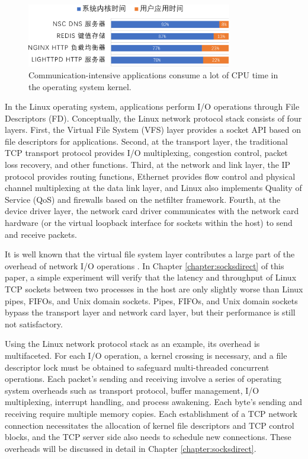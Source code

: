 \begin{figure}[htbp]
	\centering
	\includegraphics[width=0.8\textwidth]{figures/kernel_time.pdf}
	\caption{Communication-intensive applications consume a lot of CPU time in the operating system kernel.}
	\label{background:fig:kernel_time}
\end{figure}

In the Linux operating system, applications perform I/O operations through File Descriptors (FD). Conceptually, the Linux network protocol stack consists of four layers. First, the Virtual File System (VFS) layer provides a socket API based on file descriptors for applications. Second, at the transport layer, the traditional TCP transport protocol provides I/O multiplexing, congestion control, packet loss recovery, and other functions. Third, at the network and link layer, the IP protocol provides routing functions, Ethernet provides flow control and physical channel multiplexing at the data link layer, and Linux also implements Quality of Service (QoS) and firewalls based on the netfilter framework. Fourth, at the device driver layer, the network card driver communicates with the network card hardware (or the virtual loopback interface for sockets within the host) to send and receive packets.

It is well known that the virtual file system layer contributes a large part of the overhead of network I/O operations \cite {clark1989analysis,boyd2010analysis}. In Chapter \ref{chapter:socksdirect} of this paper, a simple experiment will verify that the latency and throughput of Linux TCP sockets between two processes in the host are only slightly worse than Linux pipes, FIFOs, and Unix domain sockets. Pipes, FIFOs, and Unix domain sockets bypass the transport layer and network card layer, but their performance is still not satisfactory.

Using the Linux network protocol stack as an example, its overhead is multifaceted. For each I/O operation, a kernel crossing is necessary, and a file descriptor lock must be obtained to safeguard multi-threaded concurrent operations. Each packet's sending and receiving involve a series of operating system overheads such as transport protocol, buffer management, I/O multiplexing, interrupt handling, and process awakening. Each byte's sending and receiving require multiple memory copies. Each establishment of a TCP network connection necessitates the allocation of kernel file descriptors and TCP control blocks, and the TCP server side also needs to schedule new connections. These overheads will be discussed in detail in Chapter \ref{chapter:socksdirect}.

